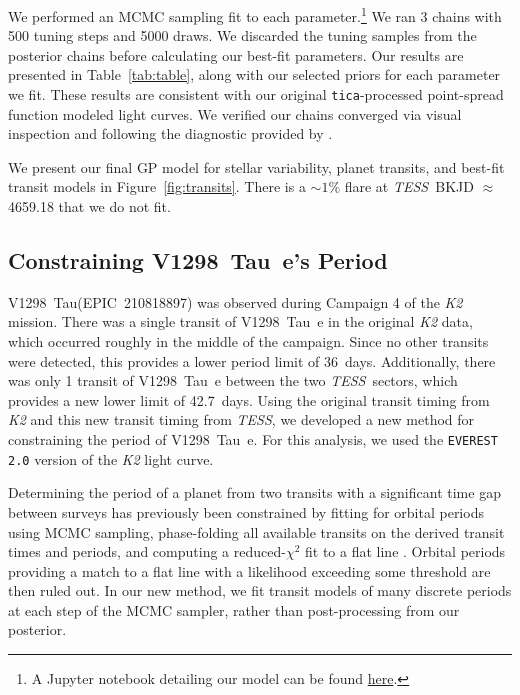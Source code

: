 \documentclass[twocolumn]{aastex631}
\newcommand{\tess}{\textit{TESS}}
\newcommand{\sname}{V1298~Tau\xspace}
\newcommand{\planete}{V1298~Tau~e\xspace}
\begin{document}
We performed an MCMC sampling fit to each parameter.\footnote{A Jupyter notebook detailing our model can be found \href{https://github.com/afeinstein20/v1298tau\_tess/blob/main/notebooks/TESS\_V1298Tau.ipynb}{here}.} We ran 3 chains with 500 tuning steps and 5000 draws. We discarded the tuning samples from the posterior chains before calculating our best-fit parameters. Our results are presented in Table~\ref{tab:table}, along with our selected priors for each parameter we fit. These results are consistent with our original \texttt{tica}-processed point-spread function modeled light curves. We verified our chains converged via visual inspection and following the diagnostic provided by \cite{Geweke92}.

We present our final GP model for stellar variability, planet transits, and best-fit transit models in Figure~\ref{fig:transits}. There is a $\sim 1\%$ flare at \tess\ BKJD $\approx$ 4659.18 that we do not fit. 


\subsection{Constraining \planete's Period}

\sname (EPIC~210818897) was observed during Campaign 4 of the \textit{K2} mission. There was a single transit of \planete in the original \textit{K2} data, which occurred roughly in the middle of the campaign. Since no other transits were detected, this provides a lower period limit of 36~days. Additionally, there was only 1 transit of \planete between the two \tess\ sectors, which provides a new lower limit of 42.7~days. Using the original transit timing from \textit{K2} and this new transit timing from \tess, we developed a new method for constraining the period of \planete. For this analysis, we used the \texttt{EVEREST 2.0} \citep{luger18} version of the \textit{K2} light curve. 

Determining the period of a planet from two transits with a significant time gap between surveys has previously been constrained by fitting for orbital periods using MCMC sampling, phase-folding all available transits on the derived transit times and periods, and computing a reduced-$\chi^2$ fit to a flat line \citep{becker19}. Orbital periods providing a match to a flat line with a likelihood exceeding some threshold are then ruled out. In our new method, we fit transit models of many discrete periods at each step of the MCMC sampler, rather than post-processing from our posterior.
\end{document}
